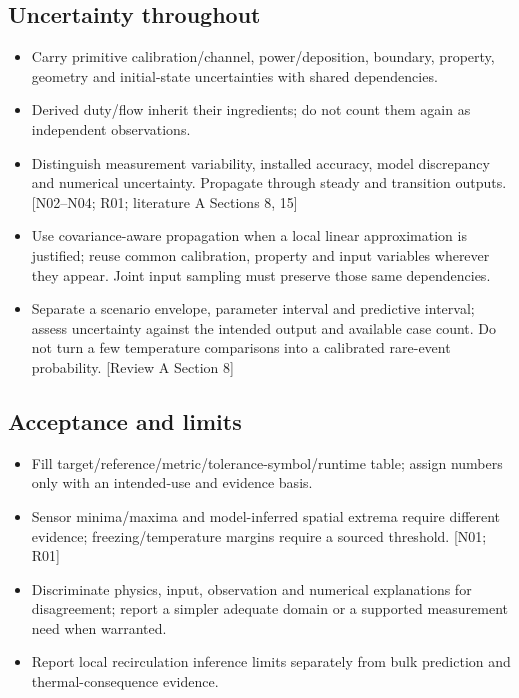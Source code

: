 \subsection{Uncertainty throughout}
\begin{itemize}[leftmargin=*]
\item Carry primitive calibration/channel, power/deposition, boundary, property, geometry and initial-state uncertainties with shared dependencies.
\item Derived duty/flow inherit their ingredients; do not count them again as independent observations.
\item Distinguish measurement variability, installed accuracy, model discrepancy and numerical uncertainty. Propagate through steady and transition outputs. [N02--N04; R01; literature A Sections 8, 15]
\item Use covariance-aware propagation when a local linear approximation is justified; reuse common calibration, property and input variables wherever they appear. Joint input sampling must preserve those same dependencies.\cite{jcgm2011vectorcovariance,jcgm2020measurementmodels}
\item Separate a scenario envelope, parameter interval and predictive interval; assess uncertainty against the intended output and available case count. Do not turn a few temperature comparisons into a calibrated rare-event probability. [Review A Section 8]
\end{itemize}

\subsection{Acceptance and limits}
\begin{itemize}[leftmargin=*]
\item Fill target/reference/metric/tolerance-symbol/runtime table; assign numbers only with an intended-use and evidence basis.
\item Sensor minima/maxima and model-inferred spatial extrema require different evidence; freezing/temperature margins require a sourced threshold. [N01; R01]
\item Discriminate physics, input, observation and numerical explanations for disagreement; report a simpler adequate domain or a supported measurement need when warranted.
\item Report local recirculation inference limits separately from bulk prediction and thermal-consequence evidence.
\end{itemize}

